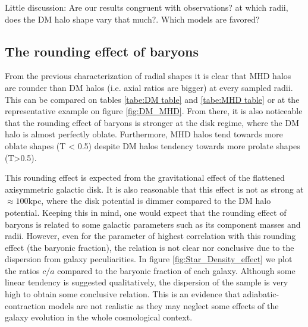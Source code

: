 \documentclass[a4paper,fleqn,usenatbib]{mnras}
\begin{document}
Little discussion: Are our results congruent with observations? at
which radii, does the DM halo shape vary that much?. Which models are
favored? 


\subsection{The rounding effect of baryons}

From the previous characterization of radial shapes it is clear that
MHD halos are rounder than DM halos (i.e. axial ratios are bigger) at
every sampled radii. This can be compared on tables \ref{tabe:DM
  table} and \ref{tabe:MHD table} or at the representative example on
figure \ref{fig:DM_MHD}. From there, it is also noticeable that the
rounding effect of baryons is stronger at the disk regime, where the
DM halo is almost perfectly oblate. Furthermore, MHD halos tend
towards more oblate shapes (T < 0.5) despite DM halos tendency towards
more prolate shapes (T>0.5). 

This rounding effect is expected from the gravitational effect of the
flattened axisymmetric galactic disk. It is also reasonable that this
effect is not as strong at $\approx 100$kpc, where the disk potential
is dimmer compared to the DM halo potential. Keeping this in mind, one
would expect that the rounding effect of baryons is related to some
galactic parameters such as its component masses and radii. However,
even for the parameter of highest correlation with this rounding
effect (the baryonic fraction), the relation is not clear nor
conclusive due to the dispersion from galaxy peculiarities. In figure
\ref{fig:Star_Density_effect} we plot the ratios $c/a$ compared to the
baryonic fraction of each galaxy. Although some linear tendency is
suggested qualitatively, the dispersion of the sample is very high to
obtain some conclusive relation. This is an evidence that
adiabatic-contraction models are not realistic as they may neglect
some effects of the galaxy evolution in the whole cosmological
context.  
\end{document}
